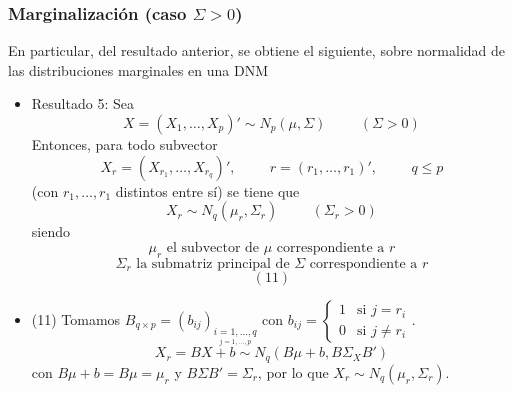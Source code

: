 \documentclass[11pt,a4paper]{article}
\begin{document}
\subsubsection{Marginalización (caso \texorpdfstring{$\Sigma > 0$}))}
En particular, del resultado anterior, se obtiene el siguiente, sobre normalidad de las distribuciones marginales en una DNM
\begin{itemize}
\item Resultado 5: Sea
$$X = (X_{1}, \dots, X_{p})' \sim N_{p}(\mu, \Sigma) \hspace{1cm} (\Sigma > 0)$$
Entonces, para todo subvector
$$X_{r} = (X_{r_{1}}, \dots, X_{r_{q}})', \hspace{1cm} r = (r_{1}, \dots, r_{1})', \hspace{1cm} q \leq p$$
(con $r_{1}, \dots, r_{1}$ distintos entre sí) se tiene que
$$X_{r} \sim N_{q}(\mu_{r}, \Sigma_{r}) \hspace{1cm} (\Sigma_{r} > 0)$$
siendo
$$\mu_{r} \text{ el subvector de } \mu \text{ correspondiente a } r$$
$$\Sigma_{r} \text{ la submatriz principal de } \Sigma \text{ correspondiente a } r$$
$$(11)$$

\item (11) Tomamos $B_{q \times p} = (b_{ij})_{\underset{j = 1, \dots, p}{i = 1, \dots, q}}$ con $b_{ij} = \begin{cases}
1 & \text{si } j = r_{i}\\
0 & \text{si } j \neq r_{i} 
\end{cases}$.
$$X_{r} = BX + b \sim N_{q}(B\mu + b, B\Sigma_{X}B')$$
con $B\mu + b = B \mu = \mu_{r}$ y $B \Sigma B' = \Sigma_{r}$, por lo que $X_{r} \sim N_{q}(\mu_{r}, \Sigma_{r})$.
\end{itemize}
\end{document}
